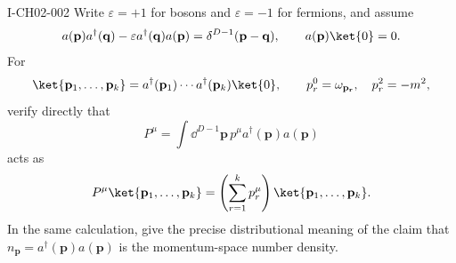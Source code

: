 \begin{exercise}{I-CH02-002}
Write $\varepsilon=+1$ for bosons and $\varepsilon=-1$ for fermions, and assume
\[
  a(\mathbf p)a^\dagger(\mathbf q)
  -\varepsilon a^\dagger(\mathbf q)a(\mathbf p)
  =\delta^{D-1}(\mathbf p-\mathbf q),
  \qquad a(\mathbf p)\ket{0}=0.
\]
For
\[
  \ket{\mathbf p_1,\ldots,\mathbf p_k}
  =a^\dagger(\mathbf p_1)\cdots a^\dagger(\mathbf p_k)\ket{0},
  \qquad p_r^0=\omega_{\mathbf{p_r}},\quad p_r^2=-m^2,
\]
verify directly that
\[
  P^\mu=\int\dd^{D-1}\mathbf p\,p^\mu a^\dagger(\mathbf p)a(\mathbf p)
\]
acts as
\[
  P^\mu\ket{\mathbf p_1,\ldots,\mathbf p_k}
  =\left(\sum_{r=1}^k p_r^\mu\right)\ket{\mathbf p_1,\ldots,\mathbf p_k}.
\]
In the same calculation, give the precise distributional meaning of the claim
that $n_{\mathbf p}=a^\dagger(\mathbf p)a(\mathbf p)$ is the momentum-space
number density.
\end{exercise}

